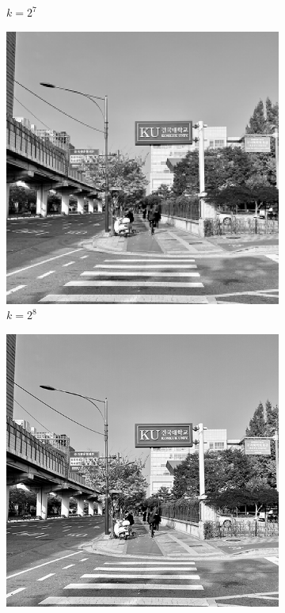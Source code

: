 \begin{figure}[H]
\begin{subfigure}[b]{0.3\textwidth}
        \caption{$k = 2^7$}
    \end{subfigure}
    \hfill
    \begin{subfigure}[b]{0.3\textwidth}
        \centering
        \includegraphics[width=\textwidth]{problem2/high_freq_256.bmp}
        \caption{$k = 2^8$}
    \end{subfigure}
    \begin{subfigure}[b]{0.3\textwidth}
        \centering
        \includegraphics[width=\textwidth]{problem2/high_freq_512.bmp}

\end{subfigure}
\end{figure}
